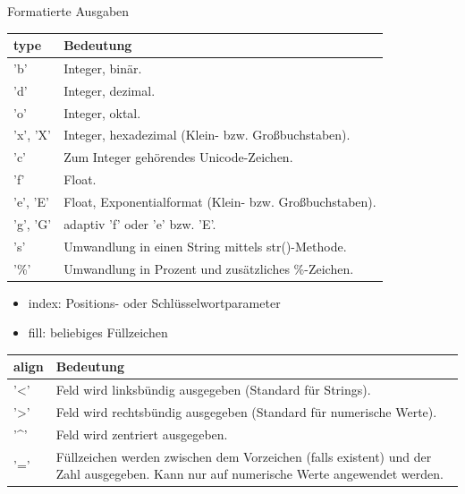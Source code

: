 \documentclass[utf8, smaller, c]{beamer}
\begin{document}
\begin{frame}{Formatierte Ausgaben}
	\vspace*{-2mm}
	\begin{tabular}{|p{1.2cm}|p{8.5cm}|} \hline
		\textbf{type} & \textbf{Bedeutung} \\ \hline
		'b' & Integer, binär. \\ \hline
		'd' & Integer, dezimal. \\ \hline
		'o' & Integer, oktal. \\ \hline
		'x', 'X' & Integer, hexadezimal (Klein- bzw. Großbuchstaben). \\ \hline
		'c' & Zum Integer gehörendes Unicode-Zeichen. \\ \hline
		'f' & Float. \\ \hline
		'e', 'E' & Float, Exponentialformat (Klein- bzw. Großbuchstaben). \\ \hline
		'g', 'G' & adaptiv 'f' oder 'e' bzw. 'E'. \\ \hline
		's' & Umwandlung in einen String mittels str()-Methode. \\ \hline
		'\%' & Umwandlung in Prozent und zusätzliches \%-Zeichen. \\ \hline
	\end{tabular}
	
	\pagebreak
	
	\vspace*{-2mm}
	\begin{itemize}
		\item index: Positions- oder Schlüsselwortparameter
		\item fill: beliebiges Füllzeichen
	\end{itemize}
	\begin{tabular}{|p{0.9cm}|p{8.5cm}|} \hline
		\textbf{align} & \textbf{Bedeutung} \\ \hline
		'<' & Feld wird linksbündig ausgegeben (Standard für Strings). \\ \hline
		'>' & Feld wird rechtsbündig ausgegeben (Standard für numerische Werte). \\ \hline
		'\^{}' & Feld wird zentriert ausgegeben. \\ \hline
		'=' & Füllzeichen werden zwischen dem Vorzeichen (falls existent) und der Zahl ausgegeben. Kann nur auf numerische Werte angewendet werden. \\ \hline
	\end{tabular}
	
	\pagebreak
	

\end{frame}
\end{document}
